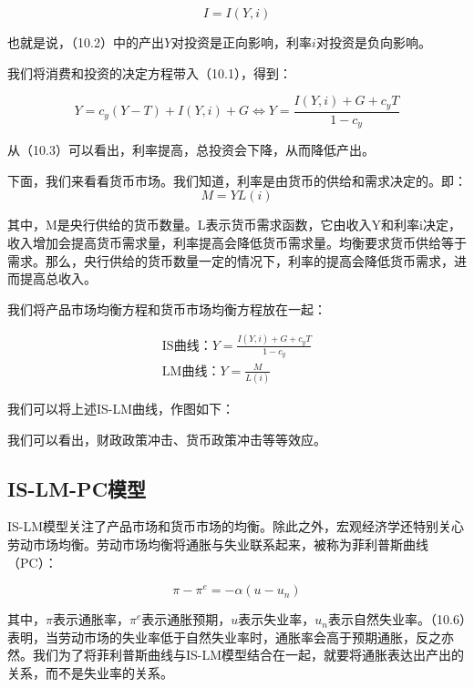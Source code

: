 \documentclass[cn,12pt,math=newtx,citestyle=gb7714-2015,bibstyle=gb7714-2015]{elegantbook}
\begin{document}
	\begin{equation}
		I = I(Y,i)
	\end{equation}
	
	也就是说，（10.2）中的产出$Y$对投资是正向影响，利率$i$对投资是负向影响。
	
	我们将消费和投资的决定方程带入（10.1），得到：
	
	\begin{equation}
		Y = c_y(Y-T) + I(Y,i) + G  \Leftrightarrow  Y = \frac{I(Y,i)+G+c_y T}{1-c_y}
	\end{equation}

从（10.3）可以看出，利率提高，总投资会下降，从而降低产出。

下面，我们来看看货币市场。我们知道，利率是由货币的供给和需求决定的。即：
\begin{equation}
	M =Y L(i)
\end{equation}
	
	其中，M是央行供给的货币数量。L表示货币需求函数，它由收入Y和利率i决定，收入增加会提高货币需求量，利率提高会降低货币需求量。均衡要求货币供给等于需求。那么，央行供给的货币数量一定的情况下，利率的提高会降低货币需求，进而提高总收入。
	
	我们将产品市场均衡方程和货币市场均衡方程放在一起：
	
	\begin{equation}
		\begin{array}{l}
			\text{IS曲线：}   Y = \frac{I(Y,i)+G+c_y T}{1-c_y}\\
			\text{LM曲线：}     Y=\frac{M}{L(i)}
		\end{array}
	\end{equation}
	
	我们可以将上述IS-LM曲线，作图如下：
	
	
	我们可以看出，财政政策冲击、货币政策冲击等等效应。
	
	\subsection{IS-LM-PC模型}
	
	IS-LM模型关注了产品市场和货币市场的均衡。除此之外，宏观经济学还特别关心劳动市场均衡。劳动市场均衡将通胀与失业联系起来，被称为菲利普斯曲线（PC）：
	
	\begin{equation}
		\pi -\pi^e = -\alpha(u-u_n)
	\end{equation}

其中，$\pi$表示通胀率，$\pi^e$表示通胀预期，$u$表示失业率，$u_n$表示自然失业率。（10.6）表明，当劳动市场的失业率低于自然失业率时，通胀率会高于预期通胀，反之亦然。我们为了将菲利普斯曲线与IS-LM模型结合在一起，就要将通胀表达出产出的关系，而不是失业率的关系。
\end{document}
